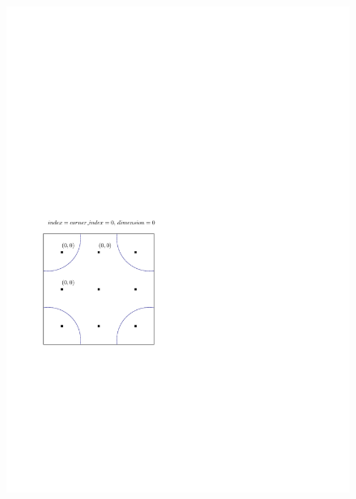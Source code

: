 \documentclass[a4paper,11pt]{article}
\begin{document}
\begin{figure}[h!]
\centerline{\includegraphics[scale=1]{fig/add_corners.pdf}}
\caption{\label{}}
\end{figure}
\end{document}
